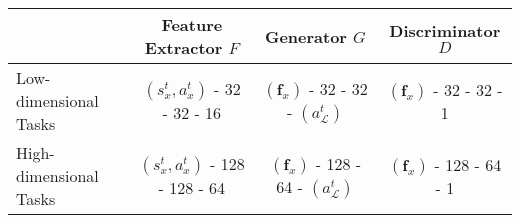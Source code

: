 
\begin{tabular}{lccc}
  \toprule
  \textbf{}              & \textbf{Feature Extractor $F$}    & \textbf{Generator $G$}                            & \textbf{Discriminator $D$}      \\
  \midrule
  Low-dimensional Tasks  & $(s^t_x, a^t_x)$ - 32 - 32 - 16   & $(\mathbf{f}_x)$ - 32 - 32 - $(a^t_\mathcal{L})$  & $(\mathbf{f}_x)$ - 32 - 32 - 1  \\
  High-dimensional Tasks & $(s^t_x, a^t_x)$ - 128 - 128 - 64 & $(\mathbf{f}_x)$ - 128 - 64 - $(a^t_\mathcal{L})$ & $(\mathbf{f}_x)$ - 128 - 64 - 1 \\
  \bottomrule
\end{tabular}
